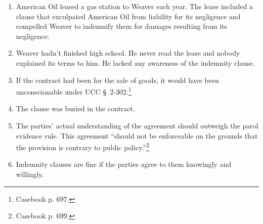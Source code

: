 \begin{enumerate}
    \item American Oil leased a gas station to Weaver each year. The lease 
    included a clause that exculpated American Oil from liability for its 
    negligence and compelled Weaver to indemnify them for damages resulting 
    from its negligence.
    \item Weaver hadn't finished high school. He never read the lease and 
    nobody explained its terms to him. He lacked any awareness of the 
    indemnity clause.
    \item If the contract had been for the sale of goods, it would have been 
    unconscionable under UCC \S\ 2-302.\footnote{Casebook p. 697.}
    \item The clause was buried in the contract.
    \item The parties' actual understanding of the agreement should outweigh 
    the parol evidence rule. This agreement ``should not be enforceable on the 
    grounds that the provision is contrary to public 
    policy.''\footnote{Casebook p. 699.}
    \item Indemnity clauses are fine if the parties agree to them knowingly 
    and willingly.
\end{enumerate}
